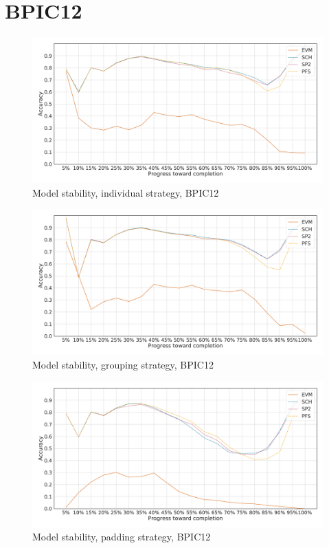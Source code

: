 \section*{BPIC12}
\begin{figure}[!htb]
    \centering
    \includegraphics[width=\textwidth]{gfx/bpic2012/individual_stability.pdf}
    \caption{Model stability, individual strategy, BPIC12}
    \label{fig:bpic12-individual-stability}
\end{figure}
\begin{figure}[!htb]
    \centering
    \includegraphics[width=\textwidth]{gfx/bpic2012/grouped_stability.pdf}
    \caption{Model stability, grouping strategy, BPIC12}
    \label{fig:bpic12-grouped-stability}
\end{figure}
\begin{figure}[!htb]
    \centering
    \includegraphics[width=\textwidth]{gfx/bpic2012/padded_stability.pdf}
    \caption{Model stability, padding strategy, BPIC12}
    \label{fig:bpic12-padded-stability}
\end{figure}
